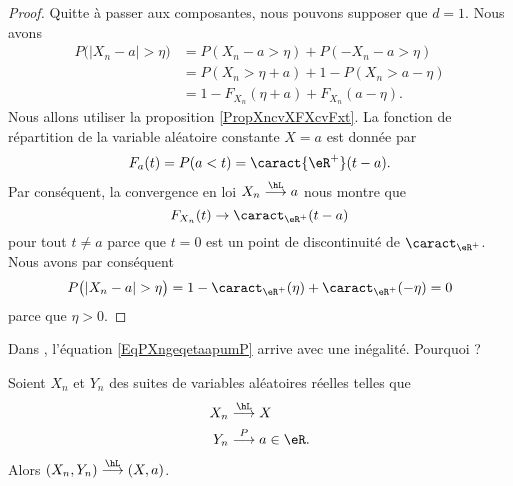 \begin{proof}
    Quitte à passer aux composantes, nous pouvons supposer que \( d=1\). Nous avons
    \begin{subequations}
        \begin{align}
           P\big( | X_n-a |>\eta \big)&=P(X_n-a>\eta)+P(-X_n-a>\eta)\\
           &=P(X_n>\eta+a)+1-P(X_n>a-\eta)  \label{EqPXngeqetaapumP}\\
           &=1-F_{X_n}(\eta+a)+F_{X_n}(a-\eta).
        \end{align}
    \end{subequations}
    Nous allons utiliser la proposition \ref{PropXncvXFXcvFxt}. La fonction de répartition de la variable aléatoire constante \( X=a\) est donnée par
    \begin{equation}
        F_a(t)=P(a<t)=\caract{\eR^+}(t-a).
    \end{equation}
    Par conséquent, la convergence en loi \( X_n\stackrel{\hL}{\longrightarrow}a\) nous montre que
    \begin{equation}
        F_{X_n}(t)\to \caract_{\eR^+}(t-a)
    \end{equation}
    pour tout \( t\neq a\) parce que \( t=0\) est un point de discontinuité de \( \caract_{\eR^+}\). Nous avons par conséquent
    \begin{equation}
        P\big( | X_n-a |>\eta \big)=1-\caract_{\eR^+}(\eta)+\caract_{\eR^+}(-\eta)=0
    \end{equation}
    parce que \( \eta>0\).
\end{proof}

\begin{probleme}
    Dans \cite{CourgGudRennes}, l'équation \eqref{EqPXngeqetaapumP} arrive avec une inégalité. Pourquoi ?
\end{probleme}

\begin{lemma}[Slutsky]  \label{LemgXDlhs}
    Soient \( X_n\) et \( Y_n\) des suites de variables aléatoires réelles telles que
    \begin{equation}
        \begin{aligned}[]
            X_n&\stackrel{\hL}{\longrightarrow} X\\
            Y_n&\stackrel{P}{\longrightarrow}a\in\eR.
        \end{aligned}
    \end{equation}
    Alors \( (X_n,Y_n)\stackrel{\hL}{\longrightarrow}(X,a)\).
\end{lemma}

